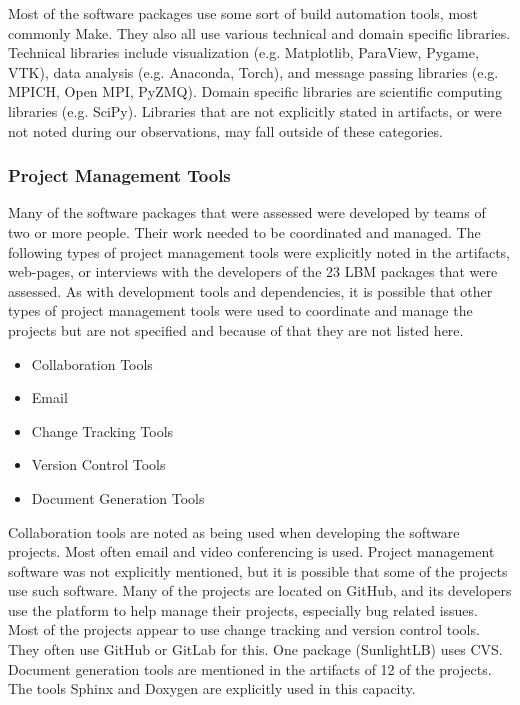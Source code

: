 \documentclass[final, 3p, times, authoryear]{elsarticle}
\begin{document}
Most of the software packages use some sort of build automation tools, most
commonly Make. They also all use various technical and domain specific
libraries. Technical libraries include visualization (e.g. Matplotlib, ParaView,
Pygame, VTK), data analysis (e.g. Anaconda, Torch), and message passing
libraries (e.g. MPICH, Open MPI, PyZMQ). Domain specific libraries are
scientific computing libraries (e.g. SciPy). Libraries that are not explicitly
stated in artifacts, or were not noted during our observations, may fall outside
of these categories. 

\subsubsection{Project Management Tools}

Many of the software packages that were assessed were developed by teams of two
or more people. Their work needed to be coordinated and managed. The following
types of project management tools were explicitly noted in the artifacts,
web-pages, or interviews with the developers of the 23 LBM packages that were
assessed. As with development tools and dependencies, it is possible that other
types of project management tools were used to coordinate and manage the
projects but are not specified and because of that they are not listed here.

	\begin{multicols}{2}	
		\begin{itemize}
			
			\item Collaboration Tools
			\item Email
			\item Change Tracking Tools
			\item Version Control Tools
			\item Document Generation Tools
		
		\end{itemize}
	\end{multicols}

Collaboration tools are noted as being used when developing the software
projects. Most often email and video conferencing is used. Project management
software was not explicitly mentioned, but it is possible that some of the
projects use such software. Many of the projects are located on GitHub, and its
developers use the platform to help manage their projects, especially bug
related issues. Most of the projects appear to use change tracking and version
control tools. They often use GitHub or GitLab for this. One package
(SunlightLB) uses CVS. Document generation tools are mentioned in the artifacts
of 12 of the projects. The tools Sphinx and Doxygen are explicitly used in this
capacity. 
\end{document}
